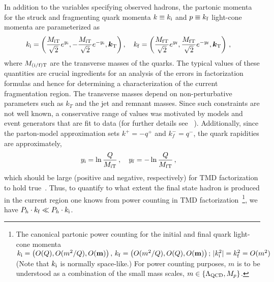 \documentclass[final,3p,times,onecolumn,sort&compress,hidelinks]{elsarticle}
\newcommand{\Tsc}[2]{#1_{#2\text{T}}}
\newcommand{\initq}{\ensuremath{k_{\rm i}}}
\newcommand{\finalq}{\ensuremath{k_{\rm f}}}
\newcommand{\inity}{\ensuremath{y_{\rm i}}}
\newcommand{\finaly}{\ensuremath{y_{\rm f}}}
\newcommand{\T}[2]{\boldsymbol{#1}_{#2\text{T}}}
\newcommand{\parz}[1]{\ensuremath{\left(#1\right)}}
\newcommand\3[1]{\boldsymbol{#1}}
\begin{document}
In addition to the variables specifying observed hadrons, the partonic momenta
for the struck and fragmenting quark 
momenta  $k\equiv\initq$ and $p\equiv\finalq$
 light-cone  momenta are parameterized as
\begin{align}
\initq &{}=\parz{\frac{\Tsc{M}{\rm i}}{\sqrt{2}} e^{\inity},-\frac{\Tsc{M}{\rm i}}{\sqrt{2}} e^{-\inity},\T{k}{}}, \quad
\finalq {}= \parz{\frac{\Tsc{M}{\rm f}}{\sqrt{2}} e^{\finaly}, \frac{\Tsc{M}{\rm f}}{\sqrt{2}} e^{-\finaly},\T{k}{}} \, ,
\label{eq:yquarkb}
\end{align}
where $\Tsc{M}{\rm (i/f)}$ are the transverse masses of the quarks.
The typical values of these quantities are crucial ingredients for an
analysis of the errors in factorization formulas and hence for
determining a characterization of the current fragmentation region.
The transverse masses depend on non-perturbative parameters such as
$k_T$ and the jet and remnant masses. Since such constraints are not well known,
a conservative range of values was motivated by models and event generators that are fit to data (for further details see ~\cite{Boglione:2016bph}). Additionally, since the parton-model approximation sets $k^+=-q^+$ and $k_f^-=q^-$, the quark rapidities are approximately,
\begin{align}
\inity {}&= \ln \frac{Q}{\Tsc{M}{\rm i} } \, ,  \quad
\finaly {}= - \ln \frac{Q}{\Tsc{M}{\rm f} }  \, , \label{eq:in outquark}
\end{align}
which should be large (positive and negative, respectively) for TMD
factorization to hold true~\cite{Collins:2011zzd,Boglione:2016bph}.
Thus, to quantify to what extent the final state hadron  is
produced in the current region one knows from power counting in TMD factorization~\footnote{The canonical partonic power counting for the initial and final quark light-cone momenta $\initq = \parz{O(Q),O(m^2/Q), O({\bf m})} , \,
  \finalq  = \parz{O(m^2/Q),O(Q), O({\bf m}) };\, 
|\initq^2| =\finalq^2 = O(m^2)$  (Note that $\initq$ is normally space-like.)
For power counting purposes, $m$ is to be understood as a combination
of the small mass scales, $m \in \{\Lambda_{\rm QCD}, M_p \}$.},
we have $P_h \cdot \finalq \ll P_h \cdot\initq$. 
\end{document}
